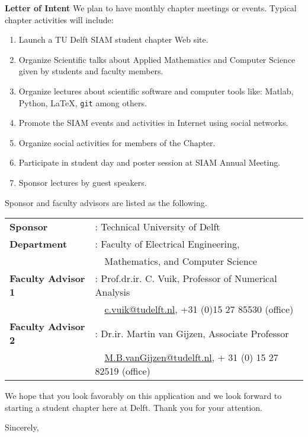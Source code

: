 \documentclass[letterpaper,12pt]{letter}
\begin{document}
\begin{letter}{\textbf{Letter of Intent}}
We plan to have monthly chapter meetings or events. Typical chapter activities will include:
\begin{enumerate}
\item Launch a TU Delft SIAM student chapter Web site.
\item Organize Scientific talks about Applied Mathematics and Computer Science given by students and faculty members.
\item Organize lectures about scientific software and computer tools like: Matlab, Python, \LaTeX, \texttt{git} among others. 
\item Promote the SIAM events and activities in Internet using social networks.
\item Organize social activities for members of the Chapter.
\item Participate in student day and poster session at SIAM Annual Meeting.
\item Sponsor lectures by guest speakers.
\end{enumerate}
\newpage
Sponsor and faculty advisors are listed as the following.

\begin{tabular}{ll}
\textbf{Sponsor} &: Technical University of Delft \\
\textbf{Department} &: Faculty of Electrical Engineering, \\
&\ \ Mathematics, and Computer Science \\
\textbf{Faculty Advisor 1} &: Prof.dr.ir. C. Vuik, Professor of Numerical Analysis \\
&\ \ \href{C.Vuik@tudelft.nl}{c.vuik@tudelft.nl}, +31 (0)15 27 85530 (office) \\
\textbf{Faculty Advisor 2} &: Dr.ir. Martin van Gijzen, Associate Professor \\
&\ \ \href{M.B.vanGijzen@tudelft.nl}{M.B.vanGijzen@tudelft.nl}, + 31 (0) 15 27 82519 (office) \\
\end{tabular}

\bigskip

We hope that you look favorably on this application and we look forward to starting a student chapter here at Delft. Thank you for your attention.

\closing{Sincerely,}


\end{letter}
\end{document}
